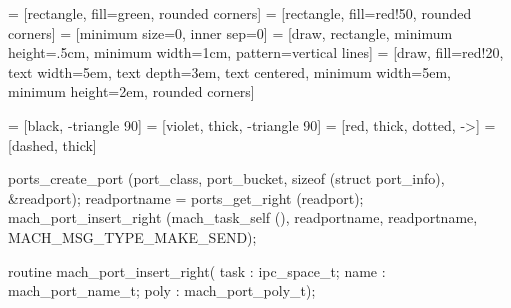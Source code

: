 \documentclass{beamer}
\begin{document}
 = [rectangle, fill=green, rounded corners]
 = [rectangle, fill=red!50, rounded corners]
 = [minimum size=0, inner sep=0]
 = [draw, rectangle, minimum height=.5cm, minimum width=1cm, pattern=vertical lines]
 = [draw, fill=red!20, text width=5em, text depth=3em, text centered,
                       minimum width=5em, minimum height=2em, rounded corners]

 = [black, -triangle 90]
 = [violet, thick, -triangle 90]
 = [red, thick, dotted, ->]
 = [dashed, thick]


\begin{frame}[fragile]
\begin{block}{}
\begin{semiverbatim}
\tiny
ports\_create\_port (port\_class, port\_bucket, sizeof (struct port\_info), \&readport);
readportname = ports\_get\_right (readport);
mach\_port\_insert\_right (mach\_task\_self (), readportname, readportname, MACH\_MSG\_TYPE\_MAKE\_SEND);
\end{semiverbatim}
\end{block}

\begin{block}{}
\begin{semiverbatim}
\tiny
routine mach\_port\_insert\_right(
                task            : ipc\_space\_t;
                name            : mach\_port\_name\_t;
                poly            : mach\_port\_poly\_t);

\end{semiverbatim}
\end{block}

\vfill

\begin{center}
\end{center}
\end{frame}
\end{document}
